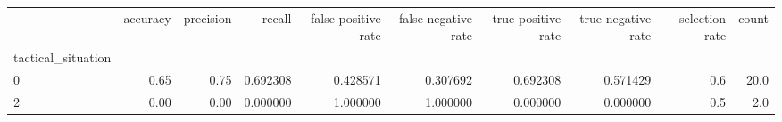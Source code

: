 \begin{tabular}{lrrrrrrrrr}
\toprule
{} &  accuracy &  precision &    recall &  false positive rate &  false negative rate &  true positive rate &  true negative rate &  selection rate &  count \\
tactical\_situation &           &            &           &                      &                      &                     &                     &                 &        \\
\midrule
0                  &      0.65 &       0.75 &  0.692308 &             0.428571 &             0.307692 &            0.692308 &            0.571429 &             0.6 &   20.0 \\
2                  &      0.00 &       0.00 &  0.000000 &             1.000000 &             1.000000 &            0.000000 &            0.000000 &             0.5 &    2.0 \\
\bottomrule
\end{tabular}
